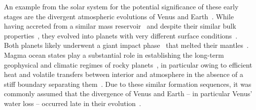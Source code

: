 \documentclass[twocolumn,twocolappendix]{aastex631}
\begin{document}
An example from the solar system for the potential significance of these early stages are the divergent atmospheric evolutions of Venus and Earth~\citep[e.g.,][]{2019JGRE..124.2015K,2021JGRE..12606643K,Salvador2023b}.
While having accreted from a similar mass reservoir~\citep{2020plas.book..287R,2020SSRv..216...55K,2020SSRv..216...27M,2020plas.book....3Z} and despite their similar bulk properties~\citep{Smrekar2018}, they evolved into planets with very different surface conditions~\citep{1982Sci...216..630D,Kasting1988,Hamano2013,Kane2014,Way2020,Turbet2021}.
Both planets likely underwent a giant impact phase~\citep{2020plas.book..287R,2020NatGe..13..265G,Liu2022} that melted their mantles~\citep{2012AREPS..40..113E,2018RSPTA.37680109S,Lichtenberg2022}.
Magma ocean states play a substantial role in establishing the long-term geophysical and climatic regimes of rocky planets~\citep{2020ChEG...80l5594F}, in particular owing to efficient heat and volatile transfers between interior and atmosphere in the absence of a stiff boundary separating them~\citep{2021ApJ...909L..22K,Dorn2021,Salvador2023b}.
Due to these similar formation sequences, it was commonly assumed that the divergence of Venus and Earth -- in particular Venus' water loss -- occurred late in their evolution~\citep[e.g.,][]{Way2020}.
\end{document}
